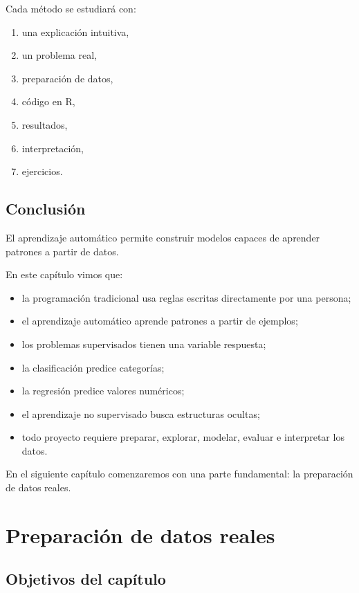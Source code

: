 \documentclass[
  11pt,
  letterpaper,
]{book}
\providecommand{\tightlist}{%
  \setlength{\itemsep}{0pt}\setlength{\parskip}{0pt}}
\begin{document}
Cada método se estudiará con:

\begin{enumerate}
\def\labelenumi{\arabic{enumi}.}
\tightlist
\item
  una explicación intuitiva,
\item
  un problema real,
\item
  preparación de datos,
\item
  código en R,
\item
  resultados,
\item
  interpretación,
\item
  ejercicios.
\end{enumerate}

\section{Conclusión}\label{conclusiuxf3n}

El aprendizaje automático permite construir modelos capaces de aprender
patrones a partir de datos.

En este capítulo vimos que:

\begin{itemize}
\tightlist
\item
  la programación tradicional usa reglas escritas directamente por una
  persona;
\item
  el aprendizaje automático aprende patrones a partir de ejemplos;
\item
  los problemas supervisados tienen una variable respuesta;
\item
  la clasificación predice categorías;
\item
  la regresión predice valores numéricos;
\item
  el aprendizaje no supervisado busca estructuras ocultas;
\item
  todo proyecto requiere preparar, explorar, modelar, evaluar e
  interpretar los datos.
\end{itemize}

En el siguiente capítulo comenzaremos con una parte fundamental: la
preparación de datos reales.


\chapter{Preparación de datos
reales}\label{preparaciuxf3n-de-datos-reales}

\section{Objetivos del capítulo}\label{objetivos-del-capuxedtulo-1}
\end{document}
